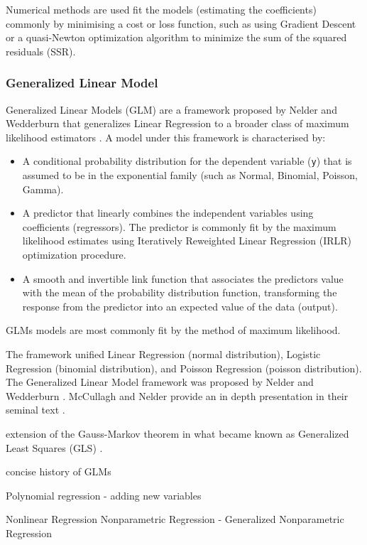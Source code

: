 \begin{bibunit}
Numerical methods are used fit the models (estimating the coefficients) commonly by minimising a cost or loss function, such as using Gradient Descent or a quasi-Newton optimization algorithm to minimize the sum of the squared residuals (SSR).

\subsubsection{Generalized Linear Model}
Generalized Linear Models (GLM) are a framework proposed by Nelder and Wedderburn that generalizes Linear Regression to a broader class of maximum likelihood estimators \cite{Nelder1972}. A model under this framework is characterised by:

\begin{itemize}
	\item A conditional probability distribution for the dependent variable (\texttt{y}) that is assumed to be in the exponential family (such as Normal, Binomial, Poisson, Gamma).
	\item A predictor that linearly combines the independent variables using coefficients (regressors). The predictor is commonly fit by the maximum likelihood estimates using Iteratively Reweighted Linear Regression (IRLR) optimization procedure.
	\item A smooth and invertible link function that associates the predictors value with the mean of the probability distribution function, transforming the response from the predictor into an expected value of the data (output).
\end{itemize}

GLMs models are most commonly fit by the method of maximum likelihood. 

The framework unified Linear Regression (normal distribution), Logistic Regression (binomial distribution), and Poisson Regression (poisson distribution). The Generalized Linear Model framework was proposed by Nelder and Wedderburn \cite{Nelder1972}. McCullagh and Nelder provide an in depth presentation in their seminal text \cite{McCullagh1989}.

extension of the Gauss-Markov theorem in what became known as Generalized Least Squares (GLS) \cite{Aitken1935}.

concise history of GLMs \cite{McCulloch2000}

Polynomial regression - adding new variables


Nonlinear Regression
Nonparametric Regression - Generalized Nonparametric Regression


\end{bibunit}

